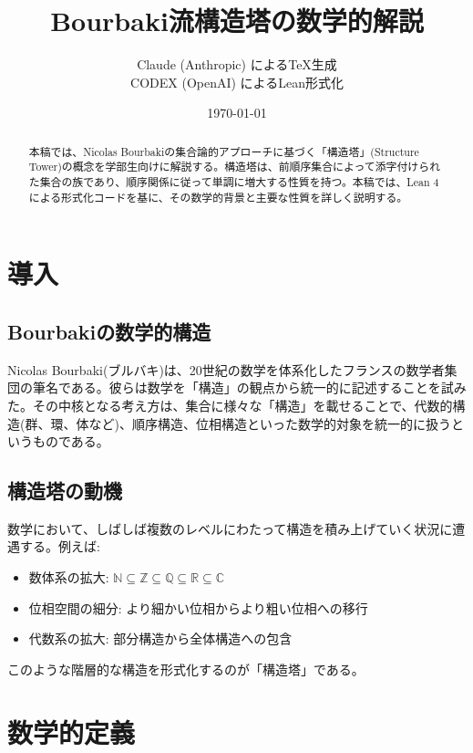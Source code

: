 \documentclass[a4paper,12pt]{article}
\title{Bourbaki流構造塔の数学的解説}
\author{Claude (Anthropic) によるTeX生成\\CODEX (OpenAI) によるLean形式化}
\date{\today}
\theoremstyle{definition}
\begin{document}
\maketitle

\begin{abstract}
本稿では、Nicolas Bourbakiの集合論的アプローチに基づく「構造塔」(Structure Tower)の概念を学部生向けに解説する。構造塔は、前順序集合によって添字付けられた集合の族であり、順序関係に従って単調に増大する性質を持つ。本稿では、Lean 4による形式化コードを基に、その数学的背景と主要な性質を詳しく説明する。
\end{abstract}

\tableofcontents

\section{導入}

\subsection{Bourbakiの数学的構造}

Nicolas Bourbaki(ブルバキ)は、20世紀の数学を体系化したフランスの数学者集団の筆名である。彼らは数学を「構造」の観点から統一的に記述することを試みた。その中核となる考え方は、集合に様々な「構造」を載せることで、代数的構造(群、環、体など)、順序構造、位相構造といった数学的対象を統一的に扱うというものである。

\subsection{構造塔の動機}

数学において、しばしば複数のレベルにわたって構造を積み上げていく状況に遭遇する。例えば:
\begin{itemize}
\item 数体系の拡大: $\mathbb{N} \subseteq \mathbb{Z} \subseteq \mathbb{Q} \subseteq \mathbb{R} \subseteq \mathbb{C}$
\item 位相空間の細分: より細かい位相からより粗い位相への移行
\item 代数系の拡大: 部分構造から全体構造への包含
\end{itemize}

このような階層的な構造を形式化するのが「構造塔」である。

\section{数学的定義}
\end{document}
